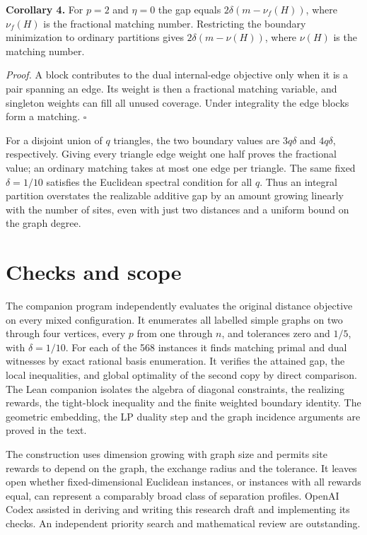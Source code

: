 \documentclass[11pt]{article}
\begin{document}
\textbf{Corollary 4.} For $p=2$ and $\eta=0$ the gap equals $2\delta(m-\nu_f(H))$, where $\nu_f(H)$ is the fractional matching number. Restricting the boundary minimization to ordinary partitions gives $2\delta(m-\nu(H))$, where $\nu(H)$ is the matching number.

\textit{Proof.} A block contributes to the dual internal-edge objective only when it is a pair spanning an edge. Its weight is then a fractional matching variable, and singleton weights can fill all unused coverage. Under integrality the edge blocks form a matching. $\square$

For a disjoint union of $q$ triangles, the two boundary values are $3q\delta$ and $4q\delta$, respectively. Giving every triangle edge weight one half proves the fractional value; an ordinary matching takes at most one edge per triangle. The same fixed $\delta=1/10$ satisfies the Euclidean spectral condition for all $q$. Thus an integral partition overstates the realizable additive gap by an amount growing linearly with the number of sites, even with just two distances and a uniform bound on the graph degree.

\section{Checks and scope}
The companion program independently evaluates the original distance objective on every mixed configuration. It enumerates all labelled simple graphs on two through four vertices, every $p$ from one through $n$, and tolerances zero and $1/5$, with $\delta=1/10$. For each of the 568 instances it finds matching primal and dual witnesses by exact rational basis enumeration. It verifies the attained gap, the local inequalities, and global optimality of the second copy by direct comparison. The Lean companion isolates the algebra of diagonal constraints, the realizing rewards, the tight-block inequality and the finite weighted boundary identity. The geometric embedding, the LP duality step and the graph incidence arguments are proved in the text.

The construction uses dimension growing with graph size and permits site rewards to depend on the graph, the exchange radius and the tolerance. It leaves open whether fixed-dimensional Euclidean instances, or instances with all rewards equal, can represent a comparably broad class of separation profiles. OpenAI Codex assisted in deriving and writing this research draft and implementing its checks. An independent priority search and mathematical review are outstanding.
\end{document}
